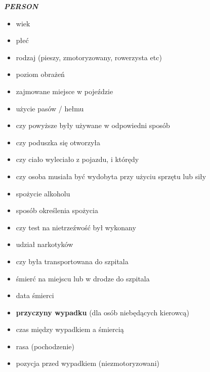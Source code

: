 \emph{\textbf{PERSON}}

\begin{itemize}
\itemsep1pt\parskip0pt
\item
  wiek\\
\item
  płeć\\
\item
  rodzaj (pieszy, zmotoryzowany, rowerzysta etc)\\
\item
  poziom obrażeń\\
\item
  zajmowane miejsce w pojeździe\\
\item
  użycie pasów / hełmu\\
\item
  czy powyższe były używane w odpowiedni sposób\\
\item
  czy poduszka się otworzyła\\
\item
  czy ciało wyleciało z pojazdu, i którędy\\
\item
  czy osoba musiała być wydobyta przy użyciu sprzętu lub siły\\
\item
  spożycie alkoholu\\
\item
  sposób określenia spożycia\\
\item
  czy test na nietrzeźwość był wykonany\\
\item
  udział narkotyków\\
\item
  czy była transportowana do szpitala\\
\item
  śmierć na miejscu lub w drodze do szpitala\\
\item
  data śmierci\\
\item
  \textbf{przyczyny wypadku} (dla osób niebędących kierowcą)\\
\item
  czas między wypadkiem a śmiercią\\
\item
  rasa (pochodzenie)\\
\item
  pozycja przed wypadkiem (niezmotoryzowani)
\end{itemize}
